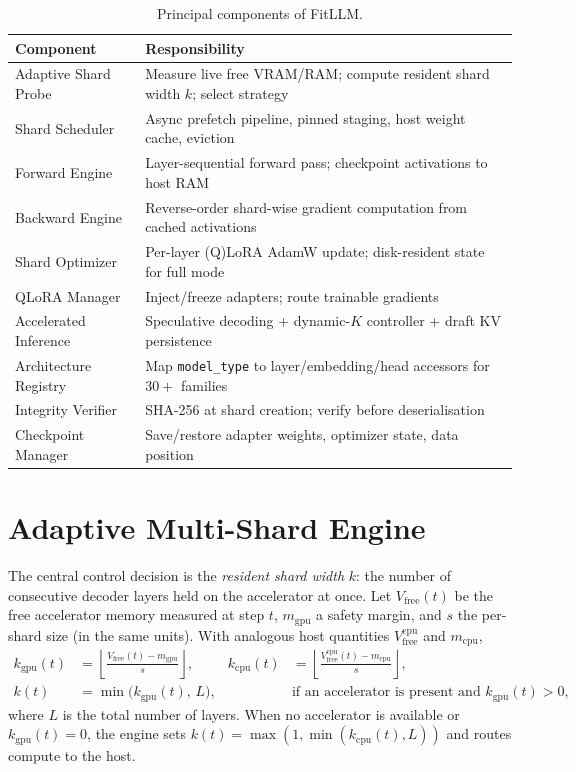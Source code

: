 \documentclass{article}
\begin{document}
\begin{table}[t]
  \centering
  \caption{Principal components of FitLLM.}
  \label{tab:components}
  \begin{tabular}{@{}ll@{}}
    \toprule
    \textbf{Component} & \textbf{Responsibility} \\
    \midrule
    Adaptive Shard Probe & Measure live free VRAM/RAM; compute resident shard width $k$; select strategy \\
    Shard Scheduler & Async prefetch pipeline, pinned staging, host weight cache, eviction \\
    Forward Engine & Layer-sequential forward pass; checkpoint activations to host RAM \\
    Backward Engine & Reverse-order shard-wise gradient computation from cached activations \\
    Shard Optimizer & Per-layer (Q)LoRA AdamW update; disk-resident state for full mode \\
    QLoRA Manager & Inject/freeze adapters; route trainable gradients \\
    Accelerated Inference & Speculative decoding + dynamic-$K$ controller + draft KV persistence \\
    Architecture Registry & Map \texttt{model\_type} to layer/embedding/head accessors for $30{+}$ families \\
    Integrity Verifier & SHA-256 at shard creation; verify before deserialisation \\
    Checkpoint Manager & Save/restore adapter weights, optimizer state, data position \\
    \bottomrule
  \end{tabular}
\end{table}

\section{Adaptive Multi-Shard Engine}
\label{sec:amse}

The central control decision is the \emph{resident shard width} $k$: the number
of consecutive decoder layers held on the accelerator at once. Let
$V_{\mathrm{free}}(t)$ be the free accelerator memory measured at step $t$,
$m_{\mathrm{gpu}}$ a safety margin, and $s$ the per-shard size (in the same
units). With analogous host quantities $V^{\mathrm{cpu}}_{\mathrm{free}}$ and
$m_{\mathrm{cpu}}$,
\begin{align}
  k_{\mathrm{gpu}}(t) &= \left\lfloor \frac{V_{\mathrm{free}}(t) - m_{\mathrm{gpu}}}{s} \right\rfloor, &
  k_{\mathrm{cpu}}(t) &= \left\lfloor \frac{V^{\mathrm{cpu}}_{\mathrm{free}}(t) - m_{\mathrm{cpu}}}{s} \right\rfloor, \\
  k(t) &= \min\!\big(k_{\mathrm{gpu}}(t),\, L\big), && \text{if an accelerator is present and } k_{\mathrm{gpu}}(t)>0, \label{eq:k}
\end{align}
where $L$ is the total number of layers. When no accelerator is available or
$k_{\mathrm{gpu}}(t)=0$, the engine sets
$k(t)=\max(1,\min(k_{\mathrm{cpu}}(t),L))$ and routes compute to the host.
\end{document}
